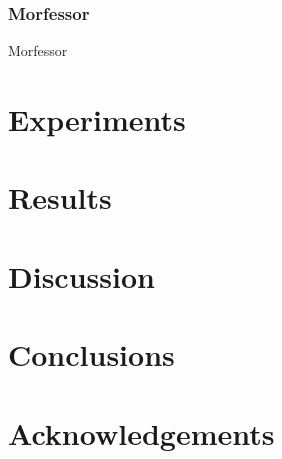 \documentclass[10pt,b5paper]{article}
\begin{document}
\subsubsection{Morfessor}

Morfessor 

\section{Experiments} 

\section{Results}

\section{Discussion}

\section{Conclusions} 

\section{Acknowledgements} 


 
\end{document}
